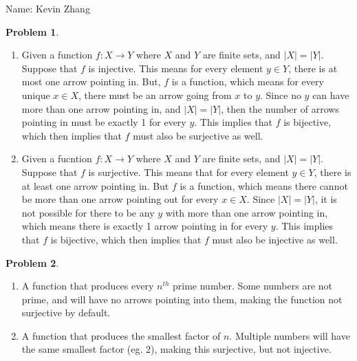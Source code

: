 \documentclass[11pt]{article}
\newcommand{\yourname}{Kevin Zhang}
\theoremstyle{definition}
\theoremstyle{case}
\theoremstyle{theorem}
\newtheorem{prob}{Problem}
\begin{document}
{\large
\noindent Name: \yourname}

\vspace{15pt}

\begin{prob}\end{prob}

\begin{enumerate}[label=(\alph*)]
\item
Given a function $f: X \rightarrow Y$ where $X$ and $Y$ are finite sets, and $|X| = |Y|$. 
Suppose that $f$ is injective. This means for every element $y \in Y$, there is at most one arrow
pointing in. But, $f$ is a function, which means for every unique $x \in X$, there must be an arrow 
going from $x$ to $y$. Since no $y$ can have more than one arrow pointing in, and $|X| = |Y|$, 
then the number of arrows pointing in must be exactly 1 for every $y$. This implies that $f$ is bijective,
which then implies that $f$ must also be surjective as well.

\item
Given a fucntion $f: X \rightarrow Y$ where $X$ and $Y$ are finite sets, and $|X| = |Y|$.
Suppose that $f$ is surjective. This means that for every element $y \in Y$, there is at least
one arrow pointing in. But $f$ is a function, which means there cannot be more 
than one arrow pointing out for every $x \in X$. Since $|X| = |Y|$, it is not possible for there to
be any $y$ with more than one arrow pointing in, which means there is exactly 1 arrow pointing in for
every $y$. This implies that $f$ is bijective, which then implies that $f$ must also be injective as well.

\end{enumerate}


\begin{prob}\end{prob}

\begin{enumerate}[label=(\alph*)]
\item 
A function that produces every $n^{th}$ prime number. Some numbers are not prime, and will have no arrows 
pointing into them, making the function not surjective by default.

\item
A function that produces the smallest factor of $n$. Multiple numbers will have the same smallest factor (eg. 2), 
making this surjective, but not injective.

\end{enumerate}
\end{document}
